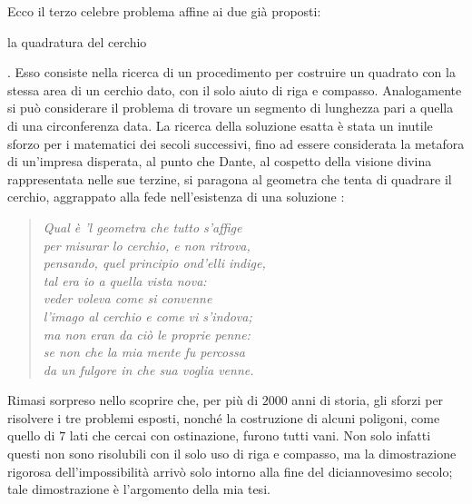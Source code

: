 Ecco il terzo celebre problema affine ai due già proposti: \begin{bfseries}la quadratura del cerchio\end{bfseries}. Esso consiste nella ricerca di un procedimento per costruire un quadrato con la stessa area di un cerchio dato, con il solo aiuto di riga e compasso. Analogamente si può considerare il problema di trovare un segmento di lunghezza pari a quella di una circonferenza data. La ricerca della soluzione esatta è stata un inutile sforzo per i matematici dei secoli successivi, fino ad essere considerata la metafora di un'impresa disperata, al punto che Dante, al cospetto della visione divina rappresentata nelle sue terzine, si paragona al geometra che tenta di quadrare il cerchio, aggrappato alla fede nell'esistenza di una soluzione \cite{Dante}:

\begin{verse}
\vspace*{0.5cm}
\emph{ 
Qual è 'l geometra che tutto s'affige \\
per misurar lo cerchio, e non ritrova,\\
pensando, quel principio ond'elli indige, \\
\vspace*{0.3cm}
tal era io a quella vista nova:  \\
veder voleva come si convenne\\
l'imago al cerchio e come vi s'indova; \\
\vspace*{0.3cm}
ma non eran da ciò le proprie penne: \\
se non che la mia mente fu percossa \\
da un fulgore in che sua voglia venne. }
\vspace*{0.5cm}
\end{verse}

Rimasi sorpreso nello scoprire che, per più di $2000$ anni di storia, gli sforzi per risolvere i tre problemi esposti, nonché la costruzione di alcuni poligoni, come quello di $7$ lati che cercai con ostinazione, furono tutti vani. Non solo infatti questi non sono risolubili con il solo uso di riga e compasso, ma la dimostrazione rigorosa dell'impossibilità arrivò solo intorno alla fine del diciannovesimo secolo; tale dimostrazione è l'argomento della mia tesi.









